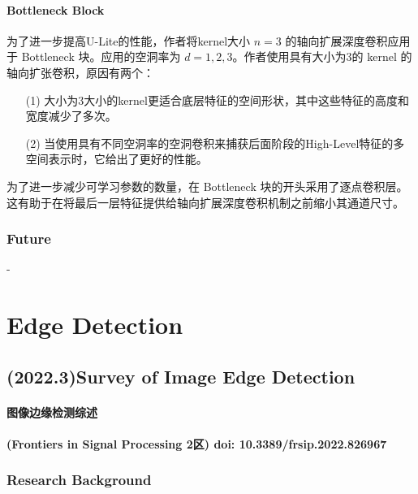 \documentclass[a4paper, 10pt]{article}
\begin{document}
			\paragraph{Bottleneck Block}
			
			为了进一步提高U-Lite的性能，作者将kernel大小 $n=3$ 的轴向扩展深度卷积应用于 Bottleneck 块。应用的空洞率为 $d = 1,2,3$。作者使用具有大小为3的 kernel 的轴向扩张卷积，原因有两个：
			
			\begin{itemize}
				\item [(1)] 大小为3大小的kernel更适合底层特征的空间形状，其中这些特征的高度和宽度减少了多次。
				
				\item [(2)] 当使用具有不同空洞率的空洞卷积来捕获后面阶段的High-Level特征的多空间表示时，它给出了更好的性能。
			\end{itemize}
			
			为了进一步减少可学习参数的数量，在 Bottleneck 块的开头采用了逐点卷积层。这有助于在将最后一层特征提供给轴向扩展深度卷积机制之前缩小其通道尺寸。
			
			\subsubsection{Future}
		
			-
	\section{Edge Detection}
		
		\subsection{(2022.3)Survey of Image Edge Detection}
			
		\paragraph{图像边缘检测综述}
			
		\paragraph{(Frontiers in Signal Processing 2区) doi: 10.3389/frsip.2022.826967}
			
			\subsubsection{Research Background}
				
\end{document}
